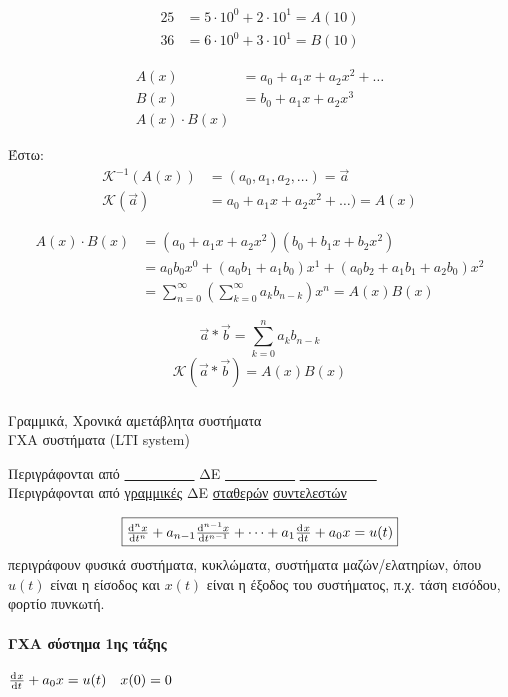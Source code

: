\documentclass[11pt,a4paper,titlepage,draft]{article}
\begin{document}
\begin{align*}
25 &= 5\cdot10^0+2\cdot10^1 = A(10)\\36&=6\cdot10^0+3\cdot10^1 = B(10)
\end{align*}

\begin{align*}
A(x) &= a_0 +a_1x+a_2x^2+\dots\\
B(x) &= b_0+a_1x+a_2x^3\\
A(x) \cdot B(x) &
\end{align*}

Έστω: \begin{align*}
\mathscr K^{-1}\left(A(x)\right) &= (a_0,a_1,a_2,\dots) = \vec{a}\\
\mathscr K\left(\vec a\right) &= a_0+a_1x+a_2x^2+ \dots) = A(x)
\end{align*}

\begin{align*}
A(x)\cdot B(x) &= (a_0+a_1x+a_2x^2)(b_0+b_1x+b_2x^2)
\\ &=
a_0b_0 x^0 + (a_0b_1+a_1b_0)x^1 + (a_0b_2+a_1b_1+a_2b_0)x^2
\\ &= \boxed{
\sum_{n=0}^\infty \left(
\sum_{k=0}^\infty a_k b_{n-k}
\right) x^n = A(x)B(x)}
\end{align*}

\[
\vec a * \vec b = \sum_{k=0}^n a_k b_{n-k}
\]
\[
\mathscr K(\vec a * \vec b)  = A(x)B(x)
\]

\subsubsection{}
Γραμμικά, Χρονικά αμετάβλητα συστήματα\\
ΓΧΑ συστήματα (\textlatin{LTI system})

Περιγράφονται από \underline{\ \ \ \ \ \ \ \ \ \ } ΔΕ \underline{\ \ \ \ \ \ \ \ \ \ } \underline{\ \ \ \ \ \ \ \ \ \ \ }\\
Περιγράφονται από \underline{γραμμικές} ΔΕ \underline{σταθερών} \underline{συντελεστών}

\[
\boxed{
\od[n]{x}{t} + a_{n-1}\od[n-1]{x}{t} + \dots + a_1\od{x}{t} + a_0x = u(t)
}
\]
περιγράφουν φυσικά συστήματα, κυκλώματα, συστήματα μαζών/ελατηρίων, όπου \(u(t)\) είναι η είσοδος και \(x(t)\) είναι η έξοδος του συστήματος, π.χ. τάση εισόδου, φορτίο πυνκωτή.

	
\paragraph{ΓΧΑ σύστημα 1ης τάξης}
\(
\od{x}{t} + a_0x =u(t) \quad x(0)= 0
\)
\end{document}
